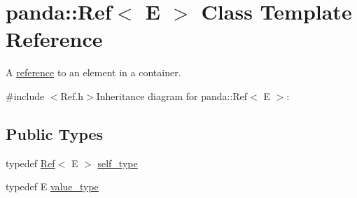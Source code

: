 \hypertarget{classpanda_1_1Ref}{
\section{panda::Ref$<$ E $>$ Class Template Reference}
\label{classpanda_1_1Ref}
}


A \hyperlink{namespacepanda_1_1reference}{reference} to an element in a container.  


{\ttfamily \#include $<$Ref.h$>$}Inheritance diagram for panda::Ref$<$ E $>$:\subsection*{Public Types}
\begin{DoxyCompactItemize}
\item 
typedef \hyperlink{classpanda_1_1Ref}{Ref}$<$ E $>$ \hyperlink{classpanda_1_1Ref_a4c030eb694aecfb39db76a6e5d536065}{self\_\-type}
\item 
typedef E \hyperlink{classpanda_1_1Ref_a52b7615b884eb959c20ef4fd8f23ded0}{value\_\-type}
\end{DoxyCompactItemize}

